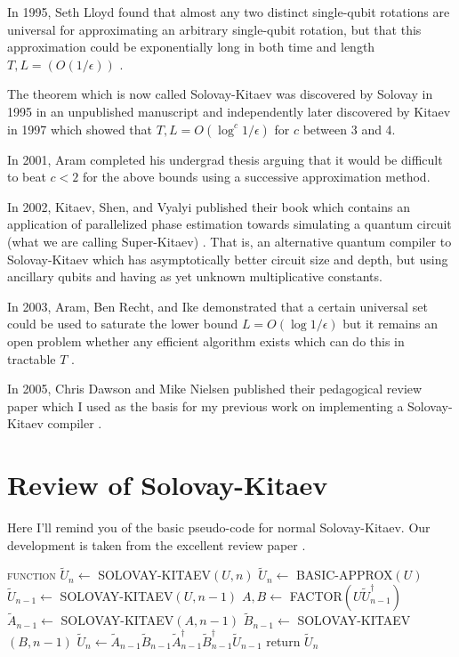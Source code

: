 \documentclass{article}
\theoremstyle{plain}
\begin{document}
In 1995, Seth Lloyd found that almost any two distinct single-qubit rotations are
universal for approximating an arbitrary single-qubit rotation, but that this
approximation could be exponentially long in both time and length $T,L = (O(1/\epsilon))$ \cite{Lloyd1995}.

The theorem which is now called Solovay-Kitaev was discovered by Solovay in
1995 in an unpublished manuscript and independently later discovered by
Kitaev in 1997 \cite{nc00} which showed that $T,L = O(\log^c{1/\epsilon})$ for
$c$ between 3 and 4.

In 2001, Aram completed his undergrad thesis arguing that it would be difficult
to beat $c < 2$ for the above bounds using a successive approximation method.\cite{harrow01}

In 2002, Kitaev, Shen, and Vyalyi published their book which contains an
application of parallelized phase estimation towards simulating a quantum
circuit (what we are calling Super-Kitaev) \cite{ksv02}.
That is, an alternative quantum compiler to Solovay-Kitaev which has
asymptotically better circuit size and depth, but using ancillary qubits
and having as yet unknown multiplicative constants.

In 2003, Aram, Ben Recht, and Ike demonstrated that a certain universal
set could be used to saturate the lower bound $L=O(\log{1/\epsilon})$
but it remains an open problem whether any efficient algorithm exists
which can do this in tractable $T$ \cite{hrc02}.

In 2005, Chris Dawson and Mike Nielsen published their pedagogical review
paper which I used as the basis for my previous work on implementing a
Solovay-Kitaev compiler \cite{Dawson2005}.

\section{Review of Solovay-Kitaev}

Here I'll remind you of the basic pseudo-code for normal Solovay-Kitaev.
Our development is taken from the excellent review paper \cite{Dawson2005}.

\begin{algorithmic}[1]
\STATE \textsc{function} $\tilde{U}_n \leftarrow$ SOLOVAY-KITAEV$(U,n)$
\STATE $\tilde{U}_n \leftarrow $ BASIC-APPROX$(U)$
\ELSE
\STATE $\tilde{U}_{n-1} \leftarrow$ SOLOVAY-KITAEV$(U, n-1)$
\STATE $A,B \leftarrow $ FACTOR$(U\tilde{U}^\dagger_{n-1})$
\STATE $\tilde{A}_{n-1} \leftarrow $ SOLOVAY-KITAEV$(A, n-1)$
\STATE $\tilde{B}_{n-1} \leftarrow $ SOLOVAY-KITAEV$(B, n-1)$
\STATE $\tilde{U}_n \leftarrow \tilde{A}_{n-1}\tilde{B}_{n-1}\tilde{A}^\dagger_{n-1}\tilde{B}^\dagger_{n-1}\tilde{U}_{n-1}$
\ENDIF
return $\tilde{U}_n$
\end{algorithmic}
\end{document}
